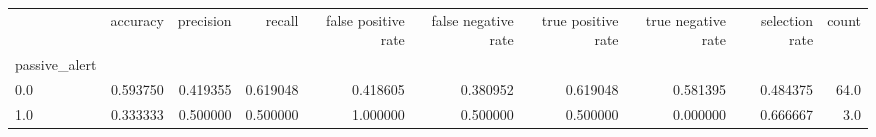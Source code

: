 \begin{tabular}{lrrrrrrrrr}
\toprule
{} &  accuracy &  precision &    recall &  false positive rate &  false negative rate &  true positive rate &  true negative rate &  selection rate &  count \\
passive\_alert &           &            &           &                      &                      &                     &                     &                 &        \\
\midrule
0.0           &  0.593750 &   0.419355 &  0.619048 &             0.418605 &             0.380952 &            0.619048 &            0.581395 &        0.484375 &   64.0 \\
1.0           &  0.333333 &   0.500000 &  0.500000 &             1.000000 &             0.500000 &            0.500000 &            0.000000 &        0.666667 &    3.0 \\
\bottomrule
\end{tabular}

